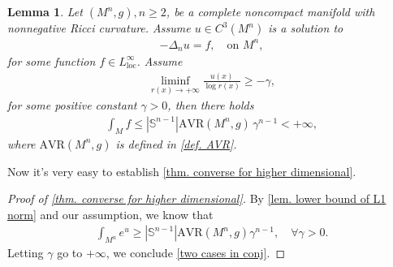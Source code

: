\documentclass[12pt]{amsart}
\theoremstyle{plain}
\newtheorem{lemma}[theorem]{Lemma}
\theoremstyle{definition}
\theoremstyle{remark}     %
\begin{document}
\begin{lemma}\label{lem. upper bound of L1 norm_second}
    Let $(M^n,g), n\geq 2$, be a complete noncompact manifold with nonnegative Ricci curvature. Assume $u\in C^3(M^n)$ is a solution to
    \begin{align*}
        -\Delta_n u=f,\quad
        \text{on }M^n,
    \end{align*}
    for some function $f\in L^{\infty}_{\text{loc}}$. Assume 
    \begin{align*}
        \liminf_{r(x)\to+\infty}
        \frac{u(x)}{\log r(x)}\geq -\gamma,
    \end{align*}
    for some positive constant $\gamma>0$, then there holds
    \begin{align*}
        \int_M f
        \leq |\mathbb{S}^{n-1}|\mathrm{AVR}(M^n,g)\, \gamma^{n-1}<+\infty,
    \end{align*}
    where $\mathrm{AVR}(M^n,g)$ is defined in \cref{def. AVR}.
\end{lemma}

Now it's very easy to establish \cref{thm. converse for higher dimensional}.
\begin{proof}[Proof of \cref{thm. converse for higher dimensional}]
    By \cref{lem. lower bound of L1 norm} and our assumption, we know that
    \begin{align*}
        \int_{M^n}e^u
        \geq |\mathbb{S}^{n-1}|
        \mathrm{AVR}(M^n,g)\gamma^{n-1},\quad \forall \gamma>0.
    \end{align*}
    Letting $\gamma$ go to $+\infty$, we conclude \cref{two cases in conj}.
\end{proof}





\end{document}

